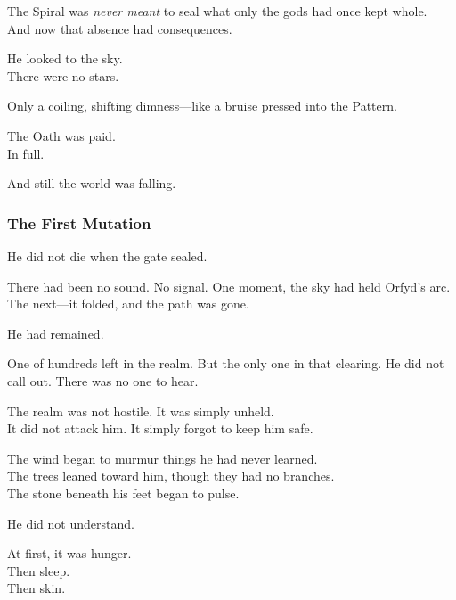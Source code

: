 \documentclass[12pt]{article}
\begin{document}
\vspace{0.5em}
The Spiral was \textit{never meant} to seal what only the gods had once kept whole.\\
And now that absence had consequences.

\vspace{0.5em}
He looked to the sky.\\
There were no stars.

\vspace{0.5em}
Only a coiling, shifting dimness---like a bruise pressed into the Pattern.

\vspace{0.5em}
The Oath was paid.\\
In full.

\vspace{0.5em}
And still the world was falling.

\dotfill

\subsubsection{The First Mutation}

He did not die when the gate sealed.

\vspace{0.5em}
There had been no sound. No signal. One moment, the sky had held Orfyd’s arc. The next---it folded, and the path was gone.

\vspace{0.5em}
He had remained.

\vspace{0.5em}
One of hundreds left in the realm. But the only one in that clearing. He did not call out. There was no one to hear.

\vspace{0.5em}
The realm was not hostile. It was simply unheld.\\
It did not attack him. It simply forgot to keep him safe.

\vspace{0.5em}
The wind began to murmur things he had never learned.\\
The trees leaned toward him, though they had no branches.\\
The stone beneath his feet began to pulse.

\vspace{0.5em}
He did not understand.

\vspace{0.5em}
At first, it was hunger.\\
Then sleep.\\
Then skin.
\end{document}
